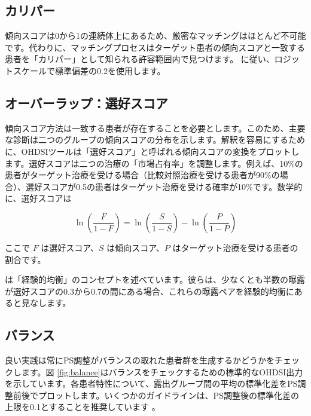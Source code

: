 \documentclass[
  11pt]{book}
\theoremstyle{definition}
\theoremstyle{definition}
\theoremstyle{definition}
\theoremstyle{definition}
\theoremstyle{remark}
\begin{document}
\subsection{カリパー}\label{ux30abux30eaux30d1ux30fc}


傾向スコアは0から1の連続体上にあるため、厳密なマッチングはほとんど不可能です。代わりに、マッチングプロセスはターゲット患者の傾向スコアと一致する患者を「カリパー」として知られる許容範囲内で見つけます。 \citet{austin_2011} に従い、ロジットスケールで標準偏差の0.2を使用します。

\subsection{オーバーラップ：選好スコア}\label{ux30aaux30fcux30d0ux30fcux30e9ux30c3ux30d7ux9078ux597dux30b9ux30b3ux30a2}


傾向スコア方法は一致する患者が存在することを必要とします。このため、主要な診断は二つのグループの傾向スコアの分布を示します。解釈を容易にするために、OHDSIツールは「選好スコア」と呼ばれる傾向スコアの変換をプロットします。選好スコアは二つの治療の「市場占有率」を調整します。例えば、10\%の患者がターゲット治療を受ける場合（比較対照治療を受ける患者が90\%の場合）、選好スコアが0.5の患者はターゲット治療を受ける確率が10\%です。数学的に、選好スコアは

\[\ln\left(\frac{F}{1-F}\right)=\ln\left(\frac{S}{1-S}\right)-\ln\left(\frac{P}{1-P}\right)\]

ここで \(F\) は選好スコア、\(S\) は傾向スコア、\(P\) はターゲット治療を受ける患者の割合です。

\citet{walker_2013} は「経験的均衡」のコンセプトを述べています。彼らは、少なくとも半数の曝露が選好スコアの0.3から0.7の間にある場合、これらの曝露ペアを経験的均衡にあると見なします。 

\subsection{バランス}\label{ux30d0ux30e9ux30f3ux30b9}

 

良い実践は常にPS調整がバランスの取れた患者群を生成するかどうかをチェックします。図 \ref{fig:balance}はバランスをチェックするための標準的なOHDSI出力を示しています。各患者特性について、露出グループ間の平均の標準化差をPS調整前後でプロットします。いくつかのガイドラインは、PS調整後の標準化差の上限を0.1とすることを推奨しています \citep{rubin_2001}。
\end{document}
